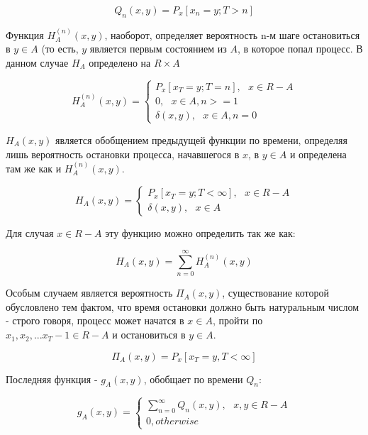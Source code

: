 \begin{equation}
 Q_n(x,y) = P_x[x_n=y; T>n]
\end{equation}

Функция $H^{(n)}_A(x,y)$, наоборот, определяет вероятность n-м шаге остановиться в $y \in A$ (то есть, $y$ является первым состоянием из $A$, в которое попал процесс. В данном случае $H_A$ определено на $R \times A$

\begin{equation}
H^{(n)}_A(x,y) = 
	\begin{cases}
		P_x[x_T=y; T=n], \ \ \ x \in R-A \\
		0, \ \ \ x \in A, n>=1 \\
		\delta(x,y), \ \ \ x \in A, n=0
	\end{cases}
\end{equation}

$H_A(x,y)$ является обобщением предыдущей функции по времени, определяя лишь вероятность остановки процесса, начавшегося в $x$, в $y \in A$ и определена там же как и $H^{(n)}_A(x,y)$.

\begin{equation}
H_A(x,y) = 
	\begin{cases}
		P_x[x_T=y; T < \infty], \ \ \ x \in R-A \\
		\delta(x,y), \ \ \ x \in A
	\end{cases}
\end{equation}

Для случая $x \in R-A$ эту функцию можно определить так же как:

\begin{equation}
H_A(x,y) = \sum^{\infty}_{n=0}H^{(n)}_A(x,y)
\end{equation}

Особым случаем является вероятность $\Pi_A(x,y)$, существование которой обусловлено тем фактом, что время остановки должно быть натуральным числом - строго говоря, процесс может начатся в $x \in A$, пройти по ${x_1, x_2,...x_T-1 \in R-A}$ и остановиться в $y \in A$.

\begin{equation}
\Pi_{A}(x,y) = P_x[x_T=y, T < \infty]
\end{equation}

Последняя функция - $g_A(x,y)$, обобщает  по времени $Q_n$:

\begin{equation}
g_A(x,y) = 
	\begin{cases}
		\sum^{\infty}_{n=0}Q_n(x,y), \ \ \ x, y \in R-A \\
		0, otherwise
	\end{cases}
\end{equation}

